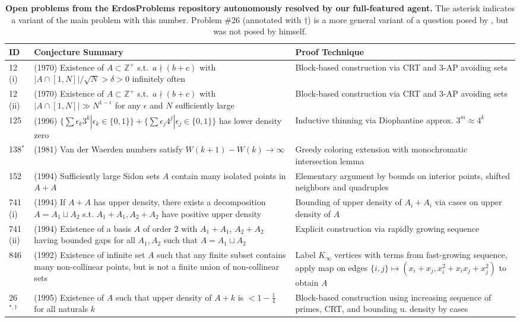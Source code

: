 \begin{table}[t]
\centering
\footnotesize
\renewcommand{\arraystretch}{1.4}
\setlength{\tabcolsep}{8pt}
\begin{tabular}{l p{6.5cm} p{6.5cm}}
\hline
\textbf{ID} & \textbf{Conjecture Summary} & \textbf{Proof Technique} \\ \hline
12\,(i) & (1970) Existence of $A \subset \mathbb{Z}^+$ s.t.\ $a \nmid (b+c)$ with $|A \cap [1,N]|/\sqrt{N} > \delta > 0$ infinitely often & Block-based construction via CRT and 3-AP avoiding sets \\
12\,(ii) & (1970) Existence of $A \subset \mathbb{Z}^+$ s.t.\ $a \nmid (b+c)$ with $|A \cap [1,N]| \gg N^{1-\epsilon}$ for any $\epsilon$ and $N$ sufficiently large & Block-based construction via CRT and 3-AP avoiding sets \\
125 & (1996) $\{ \sum \epsilon_k 3^k | \epsilon_k \in \{0,1\}\} + \{ \sum \epsilon_j 4^j | \epsilon_j \in \{0,1\}\}$ has lower density zero & Inductive thinning via Diophantine approx. $3^m \approx 4^k$  \\
138$^*$ & (1981) Van der Waerden numbers satisfy $W(k{+}1) - W(k) \to \infty$ & Greedy coloring extension with monochromatic intersection lemma \\
152 & (1994) Sufficiently large Sidon sets $A$ contain many isolated points in $A+A$ & Elementary argument by bounds on interior points, shifted neighbors and quadruples \\
741\,(i) & (1994) If $A + A$ has upper density, there exists a decomposition $A = A_1 \sqcup A_2$ s.t. $A_1 + A_1, A_2 + A_2$ have positive upper density & Bounding of upper density of $A_i + A_i$ via cases on upper density of $A$ \\
741\,(ii) & (1994) Existence of a basis $A$ of order $2$ with $A_1 + A_1$, $A_2 + A_2$ having bounded gaps for all $A_1, A_2$ such that $A = A_1 \sqcup A_2$ &  Explicit construction via rapidly growing sequence \\
846 & (1992) Existence of infinite set $A$ such that any finite subset contains many non-collinear points, but is not a finite union of non-collinear sets & Label $K_\infty$ vertices with terms from fast-growing sequence, apply map on edges $\{i,j\} \mapsto (x_i + x_j, x_i^2 + x_ix_j + x_j^2)$ to obtain $A$ \\
26$^{*, \dagger}$ & (1995) Existence of $A$ such that upper density of $A+k$ is $< 1 - \frac{1}{4}$ for all naturals $k$ & Block-based construction using increasing sequence of primes, CRT, and bounding u. density by cases \\
\hline
\end{tabular}
\caption{\textbf{Open problems from the ErdosProblems repository autonomously resolved by our full-featured agent.} The asterisk indicates a variant of the main problem with this number. Problem \#26 (annotated with $\dagger$) is a more general variant of a question posed by {\erdos}, but was not posed by {\erdos} himself.}
\label{tab:major_results}
\end{table}

